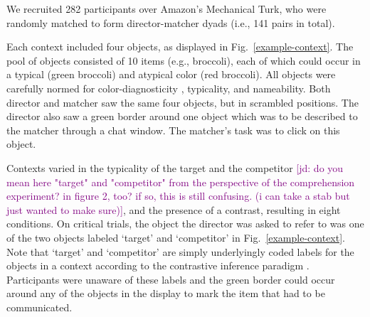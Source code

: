 \documentclass[10pt,letterpaper]{article}
\newcommand{\jd}[1]{\textcolor{Purple}{[jd: #1]}}
\newcommand{\figref}[1]{Fig.~\ref{#1}}
\begin{document}


We recruited 282 participants over Amazon's Mechanical Turk, who were randomly matched to form director-matcher dyads (i.e., 141 pairs in total). 

Each context included four objects, as displayed in \figref{example-context}. The pool of objects consisted of 10 items (e.g., broccoli), each of which could occur in a typical (green broccoli) and atypical color (red broccoli). All objects were carefully normed for color-diagnosticity \cite{Tanaka:1999}, typicality, and nameability. Both director and matcher saw the same four objects, but in scrambled positions. The director also saw a green border around one object which was to be described to the matcher through a chat window. The matcher's task was to click on this object.


Contexts varied in the typicality of the target and the competitor \jd{do you mean here "target" and "competitor" from the perspective of the comprehension experiment? in figure 2, too? if so, this is still confusing. (i can take a stab but just wanted to make sure)}, and the presence of a contrast, resulting in eight conditions. On critical trials, the object the director was asked to refer to was one of the two objects labeled `target' and `competitor' in \figref{example-context}. Note that `target' and `competitor' are simply underlyingly coded labels for the objects in a context according to the contrastive inference paradigm \cite{Sedivy:1999}. Participants were unaware of these labels and the green border could occur around any of the objects in the display to mark the item that had to be communicated. 
\end{document}
